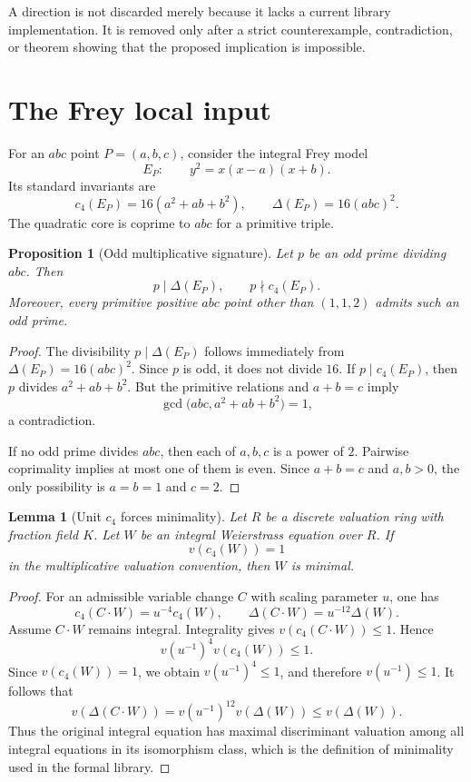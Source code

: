 \documentclass[11pt]{amsart}
\newtheorem{proposition}[theorem]{Proposition}
\newtheorem{lemma}[theorem]{Lemma}
\theoremstyle{definition}
\theoremstyle{remark}
\begin{document}
A direction is not discarded merely because it lacks a current library
implementation.  It is removed only after a strict counterexample,
contradiction, or theorem showing that the proposed implication is impossible.

\section{The Frey local input}

For an $abc$ point $P=(a,b,c)$, consider the integral Frey model
\[
 E_P:\qquad y^2=x(x-a)(x+b).
\]
Its standard invariants are
\[
 c_4(E_P)=16(a^2+ab+b^2),
 \qquad
 \Delta(E_P)=16(abc)^2.
\]
The quadratic core is coprime to $abc$ for a primitive triple.

\begin{proposition}[Odd multiplicative signature]\label{prop:odd-signature}
Let $p$ be an odd prime dividing $abc$.  Then
\[
 p\mid \Delta(E_P),
 \qquad
 p\nmid c_4(E_P).
\]
Moreover, every primitive positive $abc$ point other than $(1,1,2)$ admits
such an odd prime.
\end{proposition}

\begin{proof}
The divisibility $p\mid\Delta(E_P)$ follows immediately from
$\Delta(E_P)=16(abc)^2$.  Since $p$ is odd, it does not divide $16$.  If
$p\mid c_4(E_P)$, then $p$ divides $a^2+ab+b^2$.  But the primitive relations
and $a+b=c$ imply
\[
 \gcd\bigl(abc,a^2+ab+b^2\bigr)=1,
\]
a contradiction.

If no odd prime divides $abc$, then each of $a,b,c$ is a power of $2$.
Pairwise coprimality implies at most one of them is even.  Since $a+b=c$ and
$a,b>0$, the only possibility is $a=b=1$ and $c=2$.
\end{proof}

\begin{lemma}[Unit $c_4$ forces minimality]\label{lem:unit-c4-minimal}
Let $R$ be a discrete valuation ring with fraction field $K$.  Let $W$ be an
integral Weierstrass equation over $R$.  If
\[
 v(c_4(W))=1
\]
in the multiplicative valuation convention, then $W$ is minimal.
\end{lemma}

\begin{proof}
For an admissible variable change $C$ with scaling parameter $u$, one has
\[
 c_4(C\cdot W)=u^{-4}c_4(W),
 \qquad
 \Delta(C\cdot W)=u^{-12}\Delta(W).
\]
Assume $C\cdot W$ remains integral.  Integrality gives
$v(c_4(C\cdot W))\le 1$.  Hence
\[
 v(u^{-1})^4v(c_4(W))\le1.
\]
Since $v(c_4(W))=1$, we obtain $v(u^{-1})^4\le1$, and therefore
$v(u^{-1})\le1$.  It follows that
\[
 v(\Delta(C\cdot W))
 =v(u^{-1})^{12}v(\Delta(W))
 \le v(\Delta(W)).
\]
Thus the original integral equation has maximal discriminant valuation among
all integral equations in its isomorphism class, which is the definition of
minimality used in the formal library.
\end{proof}
\end{document}
